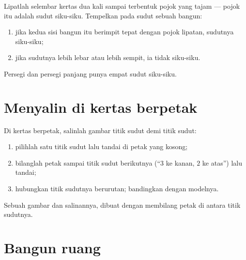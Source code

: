 \begin{method}\label{met:g2:shapes:rightangle}
Lipatlah selembar kertas dua kali sampai terbentuk pojok yang tajam
--- pojok itu adalah sudut siku-siku. Tempelkan pada sudut sebuah
bangun:
\begin{enumerate}
  \item jika kedua sisi bangun itu berimpit tepat dengan pojok
        lipatan, sudutnya siku-siku;
  \item jika sudutnya lebih lebar atau lebih sempit, ia tidak siku-siku.
\end{enumerate}
Persegi dan persegi panjang punya empat sudut siku-siku.
\end{method}

\section{Menyalin di kertas berpetak}

\begin{method}\label{met:g2:shapes:copy}
Di kertas berpetak, salinlah gambar titik sudut demi titik sudut:
\begin{enumerate}
  \item pilihlah satu titik sudut lalu tandai di petak yang kosong;
  \item bilanglah petak sampai titik sudut berikutnya (``$3$ ke
        kanan, $2$ ke atas'') lalu tandai;
  \item hubungkan titik sudutnya berurutan; bandingkan dengan modelnya.
\end{enumerate}
\end{method}

\begin{omfigure}

{\small Sebuah gambar dan salinannya, dibuat dengan membilang petak
di antara titik sudutnya.}
\end{omfigure}

\section{Bangun ruang}

